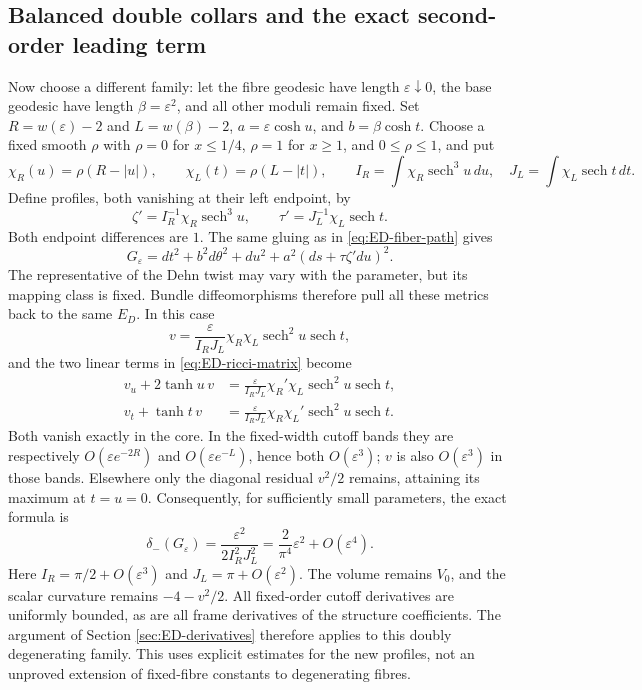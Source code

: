 \documentclass[a4paper,11pt]{article}
\numberwithin{equation}{section}
\theoremstyle{definition}
\begin{document}
\subsection{Balanced double collars and the exact second-order leading term}\label{sec:ED-double}
Now choose a different family: let the fibre geodesic have length $\varepsilon\downarrow0$,
the base geodesic have length $\beta=\varepsilon^2$, and all other moduli remain fixed.
Set $R=w(\varepsilon)-2$ and $L=w(\beta)-2$,
$a=\varepsilon\cosh u$, and $b=\beta\cosh t$.
Choose a fixed smooth $\rho$ with $\rho=0$ for $x\le1/4$, $\rho=1$ for $x\ge1$, and $0\le\rho\le1$, and put
\[
\chi_R(u)=\rho(R-|u|),\qquad \chi_L(t)=\rho(L-|t|),\qquad
I_R=\int\chi_R\operatorname{sech}^3u\,du,\quad
J_L=\int\chi_L\operatorname{sech}t\,dt.
\]
Define profiles, both vanishing at their left endpoint, by
\begin{equation}\label{eq:ED-balanced-profiles}
\zeta'=I_R^{-1}\chi_R\operatorname{sech}^3u,\qquad
\tau'=J_L^{-1}\chi_L\operatorname{sech}t.
\end{equation}
Both endpoint differences are $1$. The same gluing as in \eqref{eq:ED-fiber-path} gives
\[
G_\varepsilon=dt^2+b^2d\theta^2+du^2+
a^2(ds+\tau\zeta' du)^2.
\]
The representative of the Dehn twist may vary with the parameter, but its mapping class is fixed.
Bundle diffeomorphisms therefore pull all these metrics back to the same $E_D$.
In this case
\[
v=\frac{\varepsilon}{I_RJ_L}\chi_R\chi_L
\operatorname{sech}^2u\operatorname{sech}t,
\]
and the two linear terms in \eqref{eq:ED-ricci-matrix} become
\begin{equation}\label{eq:ED-double-cancellation}
\begin{aligned}
v_u+2\tanh u\,v&=
\frac{\varepsilon}{I_RJ_L}\chi_R'\chi_L
\operatorname{sech}^2u\operatorname{sech}t,\\
v_t+\tanh t\,v&=
\frac{\varepsilon}{I_RJ_L}\chi_R\chi_L'
\operatorname{sech}^2u\operatorname{sech}t.
\end{aligned}
\end{equation}
Both vanish exactly in the core. In the fixed-width cutoff bands they are respectively
$O(\varepsilon e^{-2R})$ and $O(\varepsilon e^{-L})$, hence both
$O(\varepsilon^3)$; $v$ is also $O(\varepsilon^3)$ in those bands.
Elsewhere only the diagonal residual $v^2/2$ remains, attaining its maximum at $t=u=0$.
Consequently, for sufficiently small parameters, the exact formula is
\begin{equation}\label{eq:ED-second}
\boxed{\delta_-(G_\varepsilon)=\frac{\varepsilon^2}{2I_R^2J_L^2}
=\frac{2}{\pi^4}\varepsilon^2+O(\varepsilon^4).}
\end{equation}
Here $I_R=\pi/2+O(\varepsilon^3)$ and $J_L=\pi+O(\varepsilon^2)$.
The volume remains $V_0$, and the scalar curvature remains $-4-v^2/2$.
All fixed-order cutoff derivatives are uniformly bounded, as are all frame derivatives of the structure coefficients.
The argument of Section \ref{sec:ED-derivatives} therefore applies to this doubly degenerating family.
This uses explicit estimates for the new profiles, not an unproved extension of fixed-fibre constants to degenerating fibres.
\end{document}
